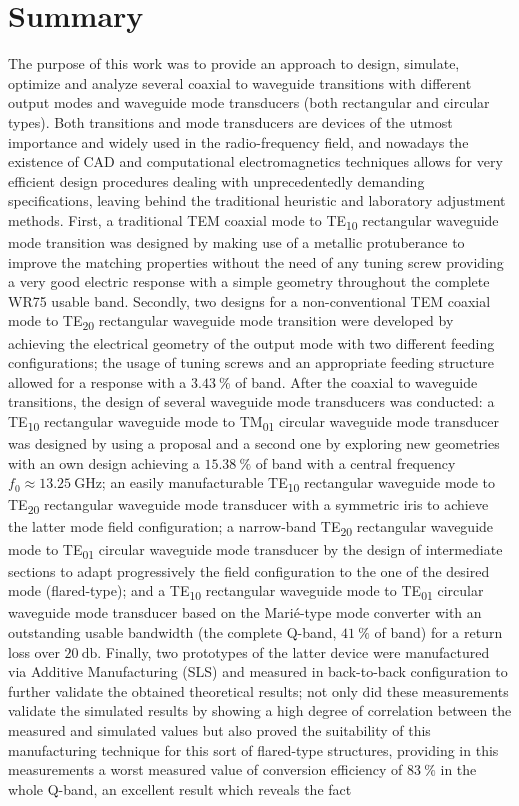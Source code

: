 \documentclass[english,twoside]{article}
\begin{document}
	\section*{Summary}
		The purpose of this work was to provide an approach to design, simulate, optimize and analyze several coaxial to waveguide transitions with different output modes and waveguide mode transducers (both rectangular and circular types). Both transitions and mode transducers are devices of the utmost importance and widely used in the radio-frequency field, and nowadays the existence of CAD and computational electromagnetics techniques allows for very efficient design procedures dealing with unprecedentedly demanding specifications, leaving behind the traditional heuristic and laboratory adjustment methods. First, a traditional \ac{TEM} coaxial mode to \ac{TE}\textsubscript{10} rectangular waveguide mode transition was designed by making use of a metallic protuberance to improve the matching properties without the need of any tuning screw providing a very good electric response with a simple geometry throughout the complete \ac{WR}75 usable band. Secondly, two designs for a non-conventional \ac{TEM} coaxial mode to \ac{TE}\textsubscript{20} rectangular waveguide mode transition were developed by achieving the electrical geometry of the output mode with two different feeding configurations; the usage of tuning screws and an appropriate feeding structure allowed for a response with a $\SI{3.43}{\percent}$ of band. After the coaxial to waveguide transitions, the design of several waveguide mode transducers was conducted: a \ac{TE}\textsubscript{10} rectangular waveguide mode to \ac{TM}\textsubscript{01} circular waveguide mode transducer was designed by using a proposal and a second one by exploring new geometries with an own design achieving a $\SI{15.38}{\percent}$ of band with a central frequency $f_0\approx\SI{13.25}{\giga\hertz}$; an easily manufacturable \ac{TE}\textsubscript{10} rectangular waveguide mode to \ac{TE}\textsubscript{20} rectangular waveguide mode transducer with a symmetric iris to achieve the latter mode field configuration; a narrow-band \ac{TE}\textsubscript{20} rectangular waveguide mode to TE\textsubscript{01} circular waveguide mode transducer by the design of intermediate sections to adapt progressively the field configuration to the one of the desired mode (flared-type); and a TE\textsubscript{10} rectangular waveguide mode to TE\textsubscript{01} circular waveguide mode transducer based on the Marié-type mode converter with an outstanding usable bandwidth (the complete Q-band, $\SI{41}{\percent}$ of band) for a return loss over $\SI{20}{\decibel}$. Finally, two prototypes of the latter device were manufactured via Additive Manufacturing (\ac{SLS}) and measured in back-to-back configuration to further validate the obtained theoretical results; not only did these measurements validate the simulated results by showing a high degree of correlation between the measured and simulated values but also proved the suitability of this manufacturing technique for this sort of flared-type structures, providing in this measurements a worst measured value of conversion efficiency of $\SI{83}{\percent}$ in the whole Q-band, an excellent result which reveals the fact 
\end{document}
